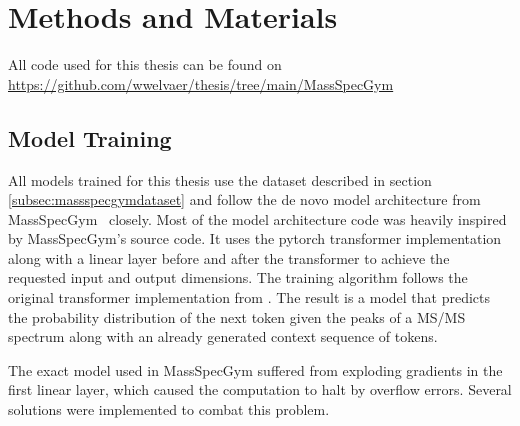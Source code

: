 \chapter{Methods and Materials}
\label{chap:methods}

All code used for this thesis can be found on \url{https://github.com/wwelvaer/thesis/tree/main/MassSpecGym}

\section{Model Training}
\label{sec:training}

All models trained for this thesis use the dataset described in section \ref{subsec:massspecgymdataset} and follow the de novo model architecture from MassSpecGym~\cite{bushuiev2024massspecgym} closely.
Most of the model architecture code was heavily inspired by MassSpecGym's source code.
It uses the pytorch transformer implementation along with a linear layer before and after the transformer to achieve the requested input and output dimensions.
The training algorithm follows the original transformer implementation from \textcite{vaswani2017attention}.
The result is a model that predicts the probability distribution of the next token given the peaks of a \ac{MS/MS} spectrum along with an already generated context sequence of tokens.

The exact model used in MassSpecGym suffered from exploding gradients in the first linear layer, which caused the computation to halt by overflow errors.
Several solutions were implemented to combat this problem.


